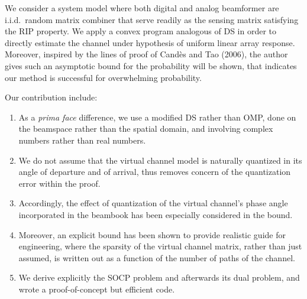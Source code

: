 We consider a system model where both digital and analog beamformer are i.i.d.\ random matrix combiner that serve readily as the sensing matrix satisfying the RIP property.
We apply a convex program analogous of DS in order to directly estimate the channel under hypothesis of uniform linear array response.
Moreover, inspired by the lines of proof of Cand\`es and Tao (2006), the author gives such an asymptotic bound for the probability will be shown, that indicates our method is successful for overwhelming probability.

Our contribution include:

\begin{enumerate}
\item As a \textit{prima face} difference, we use a modified DS rather than OMP, done on the beamspace rather than the spatial domain, and involving complex numbers rather than real numbers.
\item We do not assume that the virtual channel model is naturally quantized in its angle of departure and of arrival, thus removes concern of the quantization error within the proof.
\item Accordingly, the effect of quantization of the virtual channel's phase angle incorporated in the beambook has been especially considered in the bound.
\item Moreover, an explicit bound has been shown to provide realistic guide for engineering, where the sparsity of the virtual channel matrix, rather than just assumed, is written out as a function of the number of paths of the channel.
\item We derive explicitly the SOCP problem and afterwards its dual problem, and wrote a proof-of-concept but efficient code.
\end{enumerate}
